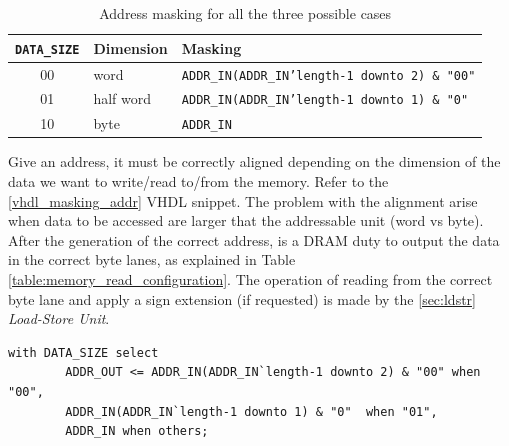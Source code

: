 \begin{table}[ht]
	\begin{center}
		\begin{tabular}{ c| l | l}
			\texttt{DATA\_SIZE} & \textbf{Dimension} & \textbf{Masking}\\
			\hline
			00 & word & \texttt{ADDR\_IN(ADDR\_IN'length-1 downto 2) \& "00"}\\
			01 & half word & \texttt{ADDR\_IN(ADDR\_IN'length-1 downto 1) \& "0"} \\
			10 & byte & \texttt{ADDR\_IN}
			
		\end{tabular}
		\caption{Address masking for all the three possible cases}
		\label{tab:addr_masking}
	\end{center}
\end{table}


Give an address, it must be correctly aligned depending on the dimension of the data we want to write/read to/from the memory. Refer to the \ref{vhdl_masking_addr} VHDL snippet. The problem with the alignment arise when data to be accessed are larger that the addressable unit (word vs byte). \\

After the generation of the correct address, is a DRAM duty to output the data in the correct byte lanes, as explained in Table \ref{table:memory_read_configuration}. The operation of reading from the correct byte lane and apply a sign extension (if requested) is made by the \ref{sec:ldstr} \emph{Load-Store Unit}.



\hfill
\begin{lstlisting}[style=vhdl,caption={VHDL code for address alignment},label=vhdl_masking_addr]
	with DATA_SIZE select
		ADDR_OUT <= ADDR_IN(ADDR_IN`length-1 downto 2) & "00" when "00",
		ADDR_IN(ADDR_IN`length-1 downto 1) & "0"  when "01",
		ADDR_IN when others;
\end{lstlisting}

